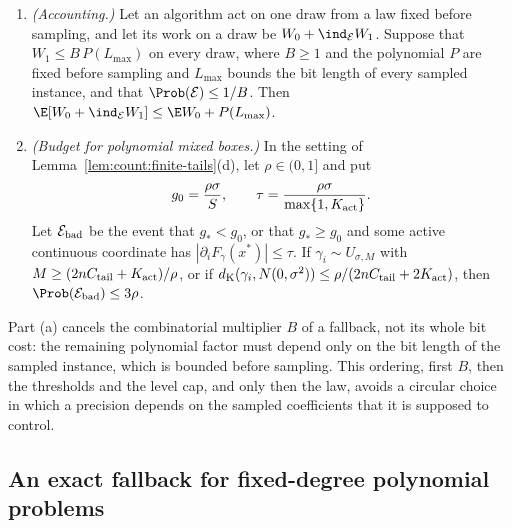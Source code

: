 \begin{lemma}\label{lem:count:rare-fallback}
\begin{enumerate}[label=(\alph*)]
\item \emph{(Accounting.)} Let an algorithm act on one draw from a law fixed
 before sampling, and let its work on a draw be $W_0+\ind_{\mathcal E}W_1$.
 Suppose that $W_1\le B\,P(L_{\max})$ on every draw, where $B\ge1$ and the
 polynomial $P$ are fixed before sampling and $L_{\max}$ bounds the bit length
 of every sampled instance, and that $\Prob(\mathcal E)\le1/B$. Then
 $\E[W_0+\ind_{\mathcal E}W_1]\le\E W_0+P(L_{\max})$.
\item \emph{(Budget for polynomial mixed boxes.)} In the setting of
 Lemma~\ref{lem:count:finite-tails}(d), let $\rho\in(0,1]$ and put
 \[
  g_0=\frac{\rho\sigma}{S},\qquad
  \tau=\frac{\rho\sigma}{\max\{1,K_{\rm act}\}} .
 \]
 Let $\mathcal E_{\rm bad}$ be the event that $g_*<g_0$, or that $g_*\ge g_0$
 and some active continuous coordinate has $|\partial_iF_\gamma(x^*)|\le\tau$.
 If $\gamma_i\sim U_{\sigma,M}$ with
 $M\ge(2nC_{\rm tail}+K_{\rm act})/\rho$, or if
 $d_{\rm K}(\gamma_i,N(0,\sigma^2))\le\rho/(2nC_{\rm tail}+2K_{\rm act})$,
 then $\Prob(\mathcal E_{\rm bad})\le3\rho$.
\end{enumerate}
\end{lemma}

Part (a) cancels the combinatorial multiplier $B$ of a fallback, not its
whole bit cost: the remaining polynomial factor must depend only on the bit
length of the sampled instance, which is bounded before sampling. This
ordering, first $B$, then the thresholds and the level cap, and only then the
law, avoids a circular choice in which a precision depends on the sampled
coefficients that it is supposed to control.

\subsection{An exact fallback for fixed-degree polynomial problems}\label{sec:count:fallback}

